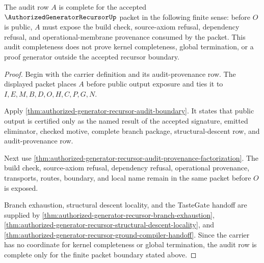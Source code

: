\begin{theorem}
\label{thm:authorized-generator-recursor-audit-row-completeness}
The audit row $A$ is complete for the accepted $\AuthorizedGeneratorRecursorUp$ packet in the following finite sense: before $O$ is public, $A$ must expose the build check, source-axiom refusal, dependency refusal, and operational-membrane provenance consumed by the packet. This audit completeness does not prove kernel completeness, global termination, or a proof generator outside the accepted recursor boundary.
\end{theorem}
\begin{proof}
Begin with the carrier definition and its audit-provenance row. The displayed packet places $A$ before public output exposure and ties it to $I,E,M,B,D,O,H,C,P,G,N$.

Apply \autoref{thm:authorized-generator-recursor-audit-boundary}. It states that public output is certified only as the named result of the accepted signature, emitted eliminator, checked motive, complete branch package, structural-descent row, and audit-provenance row.

Next use \autoref{thm:authorized-generator-recursor-audit-provenance-factorization}. The build check, source-axiom refusal, dependency refusal, operational provenance, transports, routes, boundary, and local name remain in the same packet before $O$ is exposed.

Branch exhaustion, structural descent locality, and the TasteGate handoff are supplied by \autoref{thm:authorized-generator-recursor-branch-exhaustion}, \autoref{thm:authorized-generator-recursor-structural-descent-locality}, and \autoref{thm:authorized-generator-recursor-ground-compiler-handoff}. Since the carrier has no coordinate for kernel completeness or global termination, the audit row is complete only for the finite packet boundary stated above.
\end{proof}

